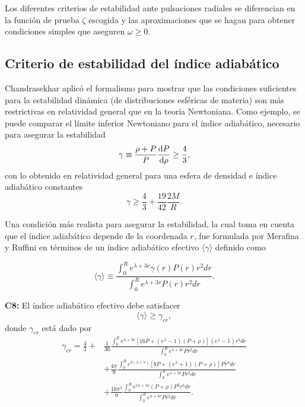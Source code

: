 Los diferentes criterios de estabilidad ante pulsaciones radiales se diferencian en la función de prueba $\zeta$ escogida y las aproximaciones que se hagan para obtener condiciones simples que aseguren $\omega \geq 0$.


\subsection*{Criterio de estabilidad del índice adiabático }

\noindent Chandrasekhar aplicó el formalismo para mostrar que las condiciones suficientes para la estabilidad dinámica (de distribuciones esféricas de materia) son más restrictivas en relatividad general que en la teoría Newtoniana. Como ejemplo, se puede comparar el límite inferior Newtoniano para el índice adiabático, necesario para asegurar la  estabilidad
\begin{equation}
    \gamma \equiv \frac { \rho + P  } { P } \dv{P}{\rho} \geq \frac{4}{3},
\end{equation}
con lo obtenido en relatividad general para una esfera de densidad e índice adiabático constantes
\begin{equation}
    \gamma \geq \frac{4}{3} +  \frac{19}{42} \frac{2M}{R}.
\end{equation}

Una condición más realista para asegurar la estabilidad, la cual toma en cuenta que el índice adiabático depende de la coordenada $r$, fue formulada por Merafina y Ruffini \cite{Merafina1989} en términos de un índice adiabático efectivo $\langle\gamma\rangle$ definido como

\begin{equation}
    \langle\gamma\rangle\equiv\frac{\int_{0}^{R} e^{\lambda+3 \nu} \gamma(r) P(r) r^{2} d r}{\int_{0}^{R} e^{\lambda+3 \nu} P(r) r^{2} d r}.
\end{equation}

\textbf{C8:} El índice adiabático efectivo debe satisfacer
\begin{equation}
     \langle\gamma\rangle \geq \gamma_{cr},
\end{equation}
donde $\gamma_{cr}$ está dado por
\begin{align}\label{gammacrit}
    \gamma_{cr} = \frac{4}{3} +& \frac{1}{36} \frac{\int_{0}^{R} e^{\lambda+3 \mathrm{v}}\left[16 P+\left(e^{\lambda}-1\right)\left(P+\rho \right)\right]\left(e^{\lambda}-1\right) r^{2} d r}{\int_{0}^{R} e^{\lambda+3 \mathrm{v}} P r^{2} d r} \nonumber
    \\ &+ \frac{4 \pi}{9} \frac{\int_{0}^{R} e^{3( \lambda+ \mathrm{v})}\left[8 P+\left(e^{\lambda}+1\right)\left(P+\rho \right)\right] P r^{4} d r}{\int_{0}^{R} e^{\lambda+3 \mathrm{v}} P r^{2} d r}
    \\ & + \frac{16 \pi^{2} }{9} \frac{\int_{0}^{R} e^{5 \lambda+3 v }\left(P+\rho \right) P^{2} r^{6} d r}{\int_{0}^{R} e^{\lambda+3 v } P r^{2} d r}. \nonumber
\end{align}

